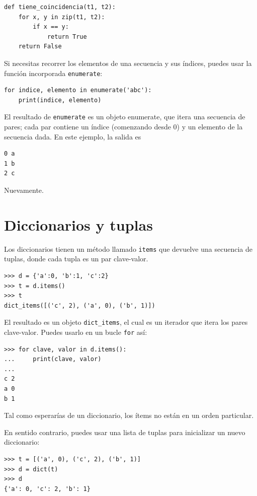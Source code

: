 \documentclass[10pt]{book}
\begin{document}
\begin{verbatim}
def tiene_coincidencia(t1, t2):
    for x, y in zip(t1, t2):
        if x == y:
            return True
    return False
\end{verbatim}
%
Si necesitas recorrer los elementos de una secuencia y sus
índices, puedes usar la función incorporada {\tt enumerate}:

\begin{verbatim}
for indice, elemento in enumerate('abc'):
    print(indice, elemento)
\end{verbatim}
%
El resultado de {\tt enumerate} es un objeto enumerate, que
itera una secuencia de pares; cada par contiene un índice (comenzando
desde 0) y un elemento de la secuencia dada.
En este ejemplo, la salida es

\begin{verbatim}
0 a
1 b
2 c
\end{verbatim}
%
Nuevamente.


\section{Diccionarios y tuplas}
\label{dictuple}

Los diccionarios tienen un método llamado {\tt items} que devuelve una secuencia de
tuplas, donde cada tupla es un par clave-valor.

\begin{verbatim}
>>> d = {'a':0, 'b':1, 'c':2}
>>> t = d.items()
>>> t
dict_items([('c', 2), ('a', 0), ('b', 1)])
\end{verbatim}
%
El resultado es un objeto \verb"dict_items", el cual es un iterador que
itera los pares clave-valor.  Puedes usarlo en un bucle {\tt for}
así:

\begin{verbatim}
>>> for clave, valor in d.items():
...     print(clave, valor)
...
c 2
a 0
b 1
\end{verbatim}
%
Tal como esperarías de un diccionario, los ítems no están en un
orden particular.

En sentido contrario, puedes usar una lista de tuplas para
inicializar un nuevo diccionario: 

\begin{verbatim}
>>> t = [('a', 0), ('c', 2), ('b', 1)]
>>> d = dict(t)
>>> d
{'a': 0, 'c': 2, 'b': 1}
\end{verbatim}
\end{document}
